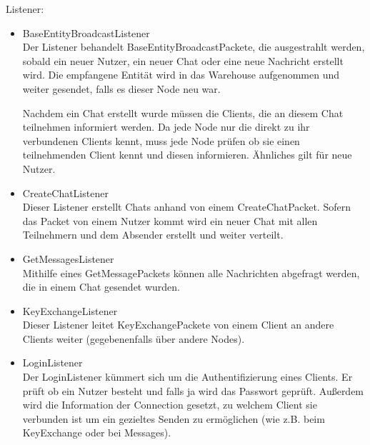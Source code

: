    Listener:
    \begin{itemize}
        \item BaseEntityBroadcastListener\\
            Der Listener behandelt BaseEntityBroadcastPackete, die ausgestrahlt werden, sobald ein neuer Nutzer, ein neuer Chat oder eine neue Nachricht erstellt wird. Die empfangene Entität wird in das Warehouse aufgenommen und weiter gesendet, falls es dieser Node neu war.
            
            Nachdem ein Chat erstellt wurde müssen die Clients, die an diesem Chat teilnehmen informiert werden. Da jede Node nur die direkt zu ihr verbundenen Clients kennt, muss jede Node prüfen ob sie einen teilnehmenden Client kennt und diesen informieren. Ähnliches gilt für neue Nutzer.
            
        \item CreateChatListener\\
            Dieser Listener erstellt Chats anhand von einem CreateChatPacket. Sofern das Packet von einem Nutzer kommt wird ein neuer Chat mit allen Teilnehmern und dem Absender erstellt und weiter verteilt.
            
        \item GetMessagesListener\\
            Mithilfe eines GetMessagePackets können alle Nachrichten abgefragt werden, die in einem Chat gesendet wurden.
            
        \item KeyExchangeListener\\
            Dieser Listener leitet KeyExchangePackete von einem Client an andere Clients weiter (gegebenenfalls über andere Nodes).
            
        \item LoginListener\\
            Der LoginListener kümmert sich um die Authentifizierung eines Clients. Er prüft ob ein Nutzer besteht und falls ja wird das Passwort geprüft.
            Außerdem wird die Information der Connection gesetzt, zu welchem Client sie verbunden ist um ein gezieltes Senden zu ermöglichen (wie z.B. beim KeyExchange oder bei Messages).

\end{itemize}

